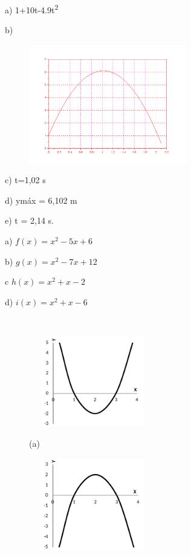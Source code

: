 \begin{enumerate}[label=\thechapter.\arabic*]
\ansitem{} a) 1+10t-4.9t\textsuperscript{2} 

b) 

\begin{figure}[H]
	\begin{Center}
		\includegraphics[width=2.71in,height=2.04in]{capitulos/funcao_do_segundo_grau/media/image37.pdf}
	\end{Center}
\end{figure}

	c) t=1,02 s

	d) ymáx = 6,102 m

	e) t = 2,14 s.

\ansitem{} a)  \( f \left( x \right) =x^{2}-5x+6 \)

    b) \( g \left( x \right) =x^{2}-7x+12 \) 

	c  \( h \left( x \right) =x^{2}+x-2 \)

	d)  \( i \left( x \right) =x^{2}+x-6 \)

\ansitem{} ~

\begin{multicols}{2}
\begin{figure}[H]
        \includegraphics[width=2.19in,height=1.55in]{capitulos/funcao_do_segundo_grau/media/image38.pdf}
        
        (a)
\end{figure}

\begin{figure}[H]
        \includegraphics[width=2.2in,height=1.58in]{capitulos/funcao_do_segundo_grau/media/image39.pdf}
        

\end{figure}
\end{multicols}
\end{enumerate}
